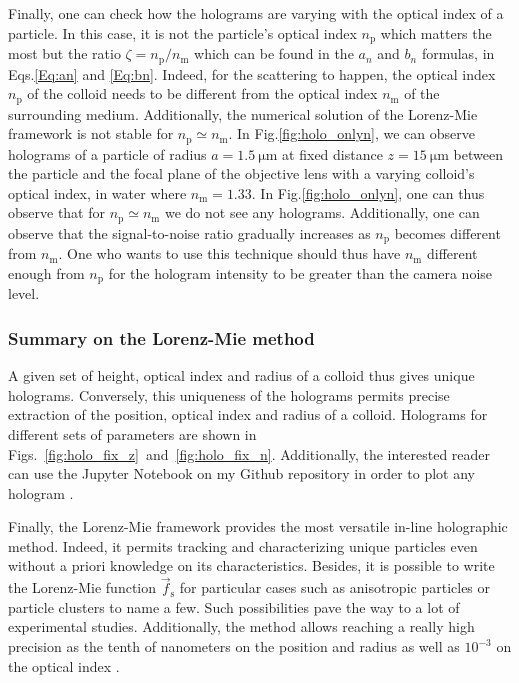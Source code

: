 Finally, one can check how the holograms are varying with the optical index of a particle. In this case, it is not the particle's optical index $n_\mathrm{p}$ which matters the most but the ratio $\zeta = n_\mathrm{p} / n_\mathrm{m} $ which can be found in the $a_n$ and $b_n$ formulas, in Eqs.\ref{Eq:an} and \ref{Eq:bn}. Indeed, for the scattering to happen, the optical index $n_\mathrm{p}$ of the colloid needs to be different from the optical index $n_\mathrm{m}$ of the surrounding medium. Additionally, the numerical solution of the Lorenz-Mie framework is not stable for $n_\mathrm{p} \simeq n_\mathrm{m}$. In Fig.\ref{fig:holo_onlyn}, we can observe holograms of a particle of radius $a = 1.5 ~ \mathrm{\mu m}$ at fixed distance $z=15 ~ \mathrm{\mu m}$ between the particle and the focal plane of the objective lens with a varying colloid's optical index, in water where $n_\mathrm{m} = 1.33$. In Fig.\ref{fig:holo_onlyn}, one can thus observe that for  $n_\mathrm{p} \simeq n_\mathrm{m}$ we do not see any holograms.  Additionally, one can observe that the signal-to-noise ratio gradually increases as $n_\mathrm{p}$ becomes different from $n_\mathrm{m}$. One who wants to use this technique should thus have $n_\mathrm{m}$ different enough from $n_\mathrm{p}$ for the hologram intensity to be greater than the camera noise level.






\subsubsection{Summary on the Lorenz-Mie method}

A given set of height, optical index and radius of a colloid thus gives unique holograms. Conversely, this uniqueness of the holograms permits precise extraction of the position, optical index and radius of a colloid. Holograms for different sets of parameters are shown in Figs.~\ref{fig:holo_fix_z}~and~\ref{fig:holo_fix_n}. Additionally, the interested reader can use  the Jupyter Notebook on my Github repository in order to plot any hologram \href{https://github.com/eXpensia/Ma-these/blob/main/02_body/chapter2/images/holo_size_exemple/holosize_variation.ipynb}{\faGithub}.  

Finally, the Lorenz-Mie framework provides the most versatile in-line holographic method. Indeed, it permits tracking and characterizing unique particles even without a priori knowledge on its characteristics. Besides, it is possible to write the Lorenz-Mie function $\vec{f}_\mathrm{s}$ for particular cases such as anisotropic particles \cite{fung_holographic_2013, wang_using_2014} or particle clusters \cite{fung_holographic_2013, perry_real-space_2013} to name a few. Such possibilities pave the way to a lot of experimental studies. Additionally, the method allows reaching a really high precision as the tenth of nanometers on the position and radius as well as $10^{-3}$ on the optical index \cite{lee_characterizing_2007}. 

